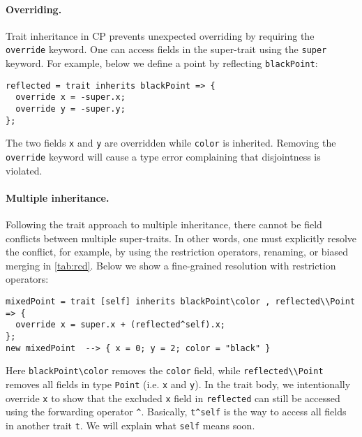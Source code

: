 \paragraph{Overriding.}
Trait inheritance in CP prevents unexpected overriding by requiring the
\lstinline{override} keyword. One can access fields in the super-trait using the
\lstinline{super} keyword. For example, below we define a point by reflecting
\lstinline{blackPoint}:
\begin{lstlisting}
reflected = trait inherits blackPoint => {
  override x = -super.x;
  override y = -super.y;
};
\end{lstlisting}
The two fields \lstinline{x} and \lstinline{y} are overridden while
\lstinline{color} is inherited. Removing the \lstinline{override} keyword will
cause a type error complaining that disjointness is violated.

\paragraph{Multiple inheritance.}
Following the trait approach to multiple inheritance, there cannot be field
conflicts between multiple super-traits. In other words, one must explicitly
resolve the conflict, for example, by using the restriction operators, renaming,
or biased merging in \autoref{tab:rcd}. Below we show a fine-grained resolution
with restriction operators:
\begin{lstlisting}
mixedPoint = trait [self] inherits blackPoint\color , reflected\\Point => {
  override x = super.x + (reflected^self).x;
};
new mixedPoint  --> { x = 0; y = 2; color = "black" }
\end{lstlisting}
Here \lstinline{blackPoint\color} removes the \lstinline{color} field, while
\lstinline{reflected\\Point} removes all fields in type \lstinline{Point} (i.e.
\lstinline{x} and \lstinline{y}). In the trait body, we intentionally override
\lstinline{x} to show that the excluded \lstinline{x} field in
\lstinline{reflected} can still be accessed using the forwarding operator
\lstinline{^}. Basically, \lstinline{t^self} is the way to access all fields in
another trait \lstinline{t}. We will explain what \lstinline{self} means soon.

